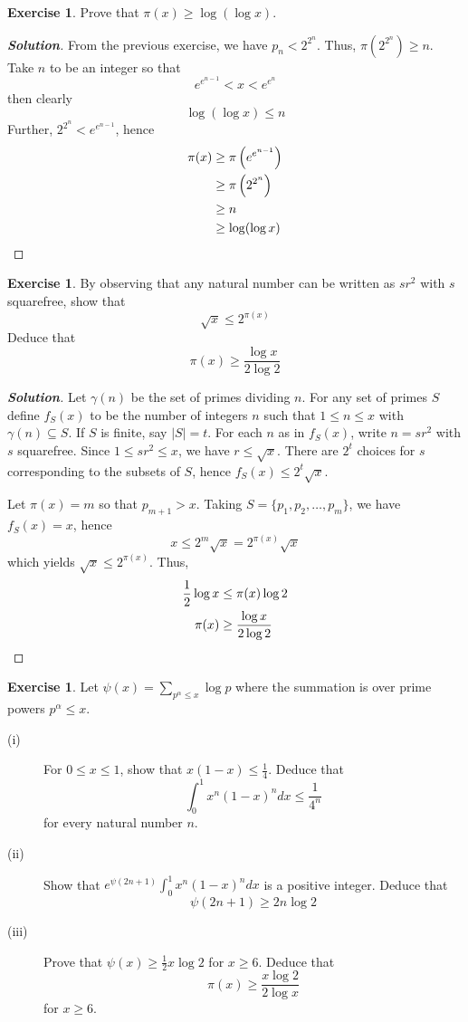 \documentclass[12pt,leqno]{book}
\numberwithin{equation}{section}
\theoremstyle{definition}
\newtheorem{exer}[thm]{Exercise}
\newenvironment{Solution}{\begin{proof}[\textnormal{\textbf{Solution}}]}{\end{proof}}
\begin{document}
\begin{exer}
Prove that $\pi(x)\geq\log(\log x)$.
\end{exer}

\begin{Solution}
 From the previous exercise, we have $p_n<2^{2^n}$. Thus, $\pi(2^{2^n})\geq n$. Take $n$ to be an integer so that \[e^{e^{n-1}}<x<e^{e^n}\] then clearly \[\log(\log x)\leq n\] Further, $2^{2^n}<e^{e^{n-1}}$, hence \begin{align*}\pi(x)&\geq \pi\left(e^{e^{n-1}}\right)\\&\geq\pi\left(2^{2^n}\right)\\&\geq n\\&\geq\log(\log x)\qedhere\end{align*}
\end{Solution}

\begin{exer}
By observing that any natural number can be written as $sr^2$ with $s$ squarefree, show that \[\sqrt{x}\leq2^{\pi(x)}\] Deduce that \[\pi(x)\geq\frac{\log x}{2\log2}\]
\end{exer}

\begin{Solution}
Let $\gamma(n)$ be the set of primes dividing $n$. For any set of primes $S$ define $f_S(x)$ to be the number of integers $n$ such that $1\leq n\leq x$ with $\gamma(n)\subseteq S$. If $S$ is finite, say $|S|=t$. For each $n$ as in $f_S(x)$, write $n=sr^2$ with $s$ squarefree. Since $1\leq sr^2\leq x$, we have $r\leq\sqrt{x}$. There are $2^t$ choices for $s$ corresponding to the subsets of $S$, hence $f_S(x)\leq 2^t\sqrt{x}$. 

Let $\pi(x)=m$ so that $p_{m+1}>x$. Taking $S=\{p_1,p_2,\hdots, p_m\}$, we have $f_S(x)=x$, hence \[x\leq2^m\sqrt{x}=2^{\pi(x)}\sqrt{x}\] which yields $\sqrt{x}\leq2^{\pi(x)}$. Thus, \begin{align*}\frac{1}{2}\log{x}&\leq\pi(x)\log2\\\pi(x)&\geq\frac{\log{x}}{2\log2}\qedhere\end{align*}
\end{Solution}

\begin{exer}
Let $\psi(x)=\sum_{p^{\alpha}\leq x}\log p$ where the summation is over prime powers $p^{\alpha}\leq x$.
 \begin{description}
 \item[(i)] For $0\leq x\leq1$, show that $x(1-x)\leq\frac{1}{4}$. Deduce that \[\int_0^1x^n(1-x)^ndx\leq\frac{1}{4^n}\]for every natural number $n$.
 \item[(ii)] Show that $e^{\psi(2n+1)}\int_0^1x^n(1-x)^ndx$ is a positive integer. Deduce that \[\psi(2n+1)\geq2n\log2\]
 \item[(iii)] Prove that $\psi(x)\geq\frac{1}{2}x\log2$ for $x\geq6$. Deduce that \[\pi(x)\geq\frac{x\log2}{2\log x}\] for $x\geq6$.
\end{description}
\end{exer}
\end{document}
